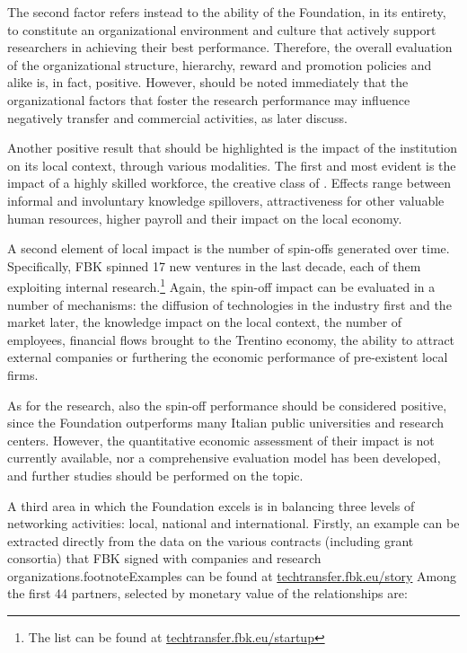 The second factor refers instead to the ability of the Foundation, in its entirety, to constitute an organizational environment and culture that actively support researchers in achieving their best performance. Therefore, the overall evaluation of the organizational structure, hierarchy, reward and promotion policies and alike is, in fact, positive. However, should be noted immediately that the organizational factors that foster the research performance may influence negatively transfer and commercial activities, as later discuss.

Another positive result that should be highlighted is the impact of the institution on its local context, through various modalities. The first and most evident is the impact of a highly skilled workforce, the creative class of \citet{Florida2002}. Effects range between informal and involuntary knowledge spillovers, attractiveness for other valuable human resources, higher payroll and their impact on the local economy. 

A second element of local impact is the number of spin-offs generated over time. Specifically, FBK spinned 17 new ventures in the last decade, each of them exploiting internal research.\footnote{The list can be found at \href{https://techtransfer.fbk.eu/startup/}{techtransfer.fbk.eu/startup}}
Again, the spin-off impact can be evaluated in a number of mechanisms: the diffusion of technologies in the industry first and the market later, the knowledge impact on the local context, the number of employees, financial flows brought to the Trentino economy, the ability to attract external companies or furthering the economic performance of pre-existent local firms. 

As for the research, also the spin-off performance should be considered positive, since the Foundation outperforms many Italian public universities and research centers. However, the quantitative economic assessment of their impact is not currently available, nor a comprehensive evaluation model has been developed, and further studies should be performed on the topic.

A third area in which the Foundation excels is in balancing three levels of networking activities: local, national and international. Firstly, an example can be extracted directly from the data on the various contracts (including grant consortia) that FBK signed with companies and research organizations.footnote{Examples can be found at \href{https://techtransfer.fbk.eu/story/}{techtransfer.fbk.eu/story}} Among the first 44 partners, selected by monetary value of the relationships are:

